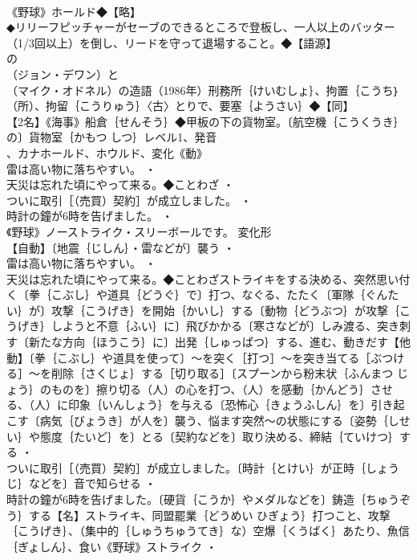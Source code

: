 \documentclass[8pt]{extreport}
\begin{document}
\begin{CJK}{UTF8}{min}
\\	《野球》ホールド◆【略】
\\	◆リリーフピッチャーがセーブのできるところで登板し、一人以上のバッター（1/3回以上）を倒し、リードを守って退場すること。◆【語源】
\\	の
\\	（ジョン・デワン）と
\\	（マイク・オドネル）の造語（1986年）刑務所｛けいむしょ｝、拘置｛こうち｝（所）、拘留｛こうりゅう｝〈古〉とりで、要塞｛ようさい｝◆【同】
\\	【2名】《海事》船倉｛せんそう｝◆甲板の下の貨物室。〔航空機｛こうくうき｝の〕貨物室｛かもつ しつ｝レベル1、発音
\\	、カナホールド、ホウルド、変化《動》
\\	雷は高い物に落ちやすい。 ・
\\	天災は忘れた頃にやって来る。◆ことわざ ・
\\	ついに取引［（売買）契約］が成立しました。 ・
\\	時計の鐘が6時を告げました。 ・
\\	《野球》ノーストライク・スリーボールです。	変化形 
\\	【自動】〔地震｛じしん｝・雷などが〕襲う ・
\\	雷は高い物に落ちやすい。 ・
\\	天災は忘れた頃にやって来る。◆ことわざストライキをする決める、突然思い付く〔拳｛こぶし｝や道具｛どうぐ｝で〕打つ、なぐる、たたく〔軍隊｛ぐんたい｝が〕攻撃｛こうげき｝を開始｛かいし｝する〔動物｛どうぶつ｝が攻撃｛こうげき｝しようと不意｛ふい｝に〕飛びかかる〔寒さなどが〕しみ渡る、突き刺す〔新たな方向｛ほうこう｝に〕出発｛しゅっぱつ｝する、進む、動きだす【他動】〔拳｛こぶし｝や道具を使って〕～を突く［打つ］～を突き当てる［ぶつける］～を削除｛さくじょ｝する［切り取る］〔スプーンから粉末状｛ふんまつ じょう｝のものを〕擦り切る（人）の心を打つ、（人）を感動｛かんどう｝させる、（人）に印象｛いんしょう｝を与える〔恐怖心｛きょうふしん｝を〕引き起こす〔病気｛びょうき｝が人を〕襲う、悩ます突然～の状態にする〔姿勢｛しせい｝や態度｛たいど｝を〕とる〔契約などを〕取り決める、締結｛ていけつ｝する ・
\\	ついに取引［（売買）契約］が成立しました。〔時計｛とけい｝が正時｛しょうじ｝などを〕音で知らせる ・
\\	時計の鐘が6時を告げました。〔硬貨｛こうか｝やメダルなどを〕鋳造｛ちゅうぞう｝する【名】ストライキ、同盟罷業｛どうめい ひぎょう｝打つこと、攻撃｛こうげき｝、（集中的｛しゅうちゅうてき｝な）空爆｛くうばく｝あたり、魚信｛ぎょしん｝、食い《野球》ストライク ・

\end{CJK}
\end{document}
